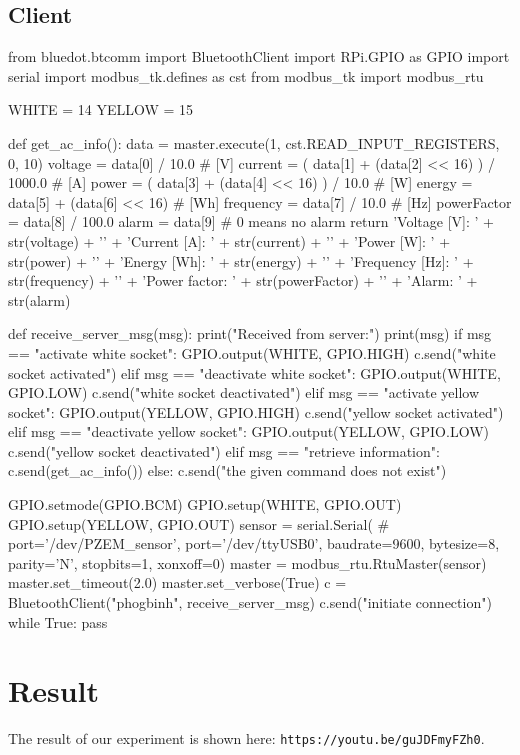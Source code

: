 \documentclass[12pt, a4paper, onside]{article}
\begin{document}
\subsection{Client}
\begin{python}
from bluedot.btcomm import BluetoothClient
import RPi.GPIO as GPIO
import serial
import modbus_tk.defines as cst
from modbus_tk import modbus_rtu

WHITE = 14
YELLOW = 15

def get_ac_info():
  data = master.execute(1, cst.READ_INPUT_REGISTERS, 0, 10)
  voltage     =   data[0]                     / 10.0   # [V]
  current     = ( data[1] + (data[2] << 16) ) / 1000.0 # [A]
  power       = ( data[3] + (data[4] << 16) ) / 10.0   # [W]
  energy      =   data[5] + (data[6] << 16)            # [Wh]
  frequency   =   data[7]                     / 10.0   # [Hz]
  powerFactor =   data[8]                     / 100.0
  alarm       =   data[9]                              # 0 means no alarm
  return 'Voltage [V]: ' + str(voltage) + '\n' + 'Current [A]: ' + str(current) + '\n' + 'Power [W]: ' + str(power) + '\n' + 'Energy [Wh]: ' + str(energy) + '\n' + 'Frequency [Hz]: ' + str(frequency) + '\n' + 'Power factor: ' + str(powerFactor) + '\n' + 'Alarm: ' + str(alarm)

def receive_server_msg(msg):
  print("Received from server:")
  print(msg)
  if msg == "activate white socket":
    GPIO.output(WHITE, GPIO.HIGH)
    c.send("white socket activated")
  elif msg == "deactivate white socket":
    GPIO.output(WHITE, GPIO.LOW)
    c.send("white socket deactivated")
  elif msg == "activate yellow socket":
    GPIO.output(YELLOW, GPIO.HIGH)
    c.send("yellow socket activated")
  elif msg == "deactivate yellow socket":
    GPIO.output(YELLOW, GPIO.LOW)
    c.send("yellow socket deactivated")
  elif msg == "retrieve information":
    c.send(get_ac_info())
  else:
    c.send("the given command does not exist")

GPIO.setmode(GPIO.BCM)
GPIO.setup(WHITE, GPIO.OUT)
GPIO.setup(YELLOW, GPIO.OUT)
sensor = serial.Serial(
#  port='/dev/PZEM_sensor',
  port='/dev/ttyUSB0',
  baudrate=9600,
  bytesize=8,
  parity='N',
  stopbits=1,
  xonxoff=0)
master = modbus_rtu.RtuMaster(sensor)
master.set_timeout(2.0)
master.set_verbose(True)
c = BluetoothClient("phogbinh", receive_server_msg)
c.send("initiate connection")
while True:
  pass
\end{python}

\section{Result}
The result of our experiment is shown here: \texttt{https://youtu.be/guJDFmyFZh0}.
\end{document}
